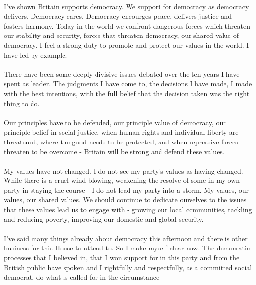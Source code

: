 \documentclass[14pt]{article}
\begin{document}
\begin{onehalfspace}
\paragraph{}I've shown Britain supports democracy. We support for democracy as democracy delivers. Democracy cares. Democracy encourges peace, delivers justice and fosters harmony. Today in the world we confront dangerous forces which threaten our stability and security, forces that threaten democracy, our shared value of democracy. I feel a strong duty to promote and protect our values in the world. I have led by example.

\paragraph{}There have been some deeply divisive issues debated over the ten years I have spent as leader. The judgments I have come to, the decisions I have made, I made with the best intentions, with the full belief that the decision taken was the right thing to do.

\paragraph{}Our principles have to be defended, our principle value of democracy, our principle belief in social justice, when human rights and individual liberty are threatened, where the good needs to be protected, and when repressive forces threaten to be overcome - Britain will be strong and defend these values.

\paragraph{}My values have not changed. I do not see my party's values as having changed. While there is a cruel wind blowing, weakening the resolve of some in my own party in staying the course - I do not lead my party into a storm. My values, our values, our shared values. We should continue to dedicate ourselves to the issues that these values lead us to engage with - growing our local communities, tackling and reducing poverty, improving our domestic and global security.

\paragraph{}I've said many things already about democracy this afternoon and there is other business for this House to attend to. So I make myself clear now. The democratic processes that I believed in, that I won support for in this party and from the British public have spoken and I rightfully and respectfully, as a committed social democrat, do what is called for in the circumstance.


\end{onehalfspace}
\end{document}
